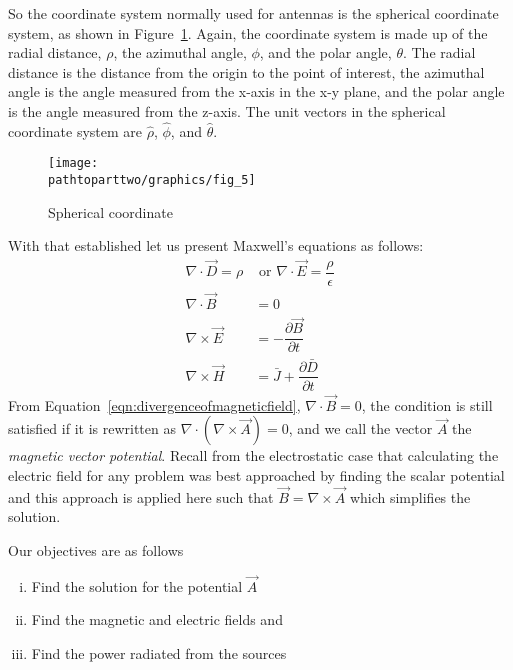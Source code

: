 So the coordinate system normally used for antennas is the spherical coordinate system, as shown in Figure~\ref{fig:sphericalcoordinate}. Again, the coordinate system is made up of the radial distance, $\rho$, the azimuthal angle, $\phi$, and the polar angle, $\theta$. The radial distance is the distance from the origin to the point of interest, the azimuthal angle is the angle measured from the x-axis in the x-y plane, and the polar angle is the angle measured from the z-axis. The unit vectors in the spherical coordinate system are $\hat{\rho}$, $\hat{\phi}$, and $\hat{\theta}$.
\begin{figure}[h]
\centering
\texttt{[image: \\pathtoparttwo/graphics/fig\_5]}
\caption{Spherical coordinate}
\label{fig:sphericalcoordinate}
\end{figure}

With that established let us present Maxwell's equations as follows:
\begin{align}
\nabla\cdot\vec{D} =\rho&\text{ or }\nabla \cdot\vec{E} =\dfrac{\rho}{\epsilon}\label{eqn:gausslaw}\\
\nabla\cdot\vec{B}&=0\label{eqn:divergenceofmagneticfield}\\
\nabla\times\vec{E}&=- \dfrac{\partial\vec{B}}{\partial t}\label{eqn:faradayslaw}\\
\nabla\times\vec{H}&=\bar{J}+\dfrac{\partial\bar{D}}{\partial t}\label{eqn:ampereslaw}
\end{align}
From Equation~\eqref{eqn:divergenceofmagneticfield}, $\nabla\cdot\vec{B}=0$, the condition is still satisfied if it is rewritten as $\nabla\cdot(\nabla\times\vec{A})=0$, and we call the vector $\vec{A}$ the \emph{magnetic vector potential}. Recall from the electrostatic case that calculating the electric field for any problem was best approached by finding the scalar potential and this approach is applied here such that $\vec{B}=\nabla\times\vec{A}$ which simplifies the solution.

Our objectives are as follows
\begin{enumerate}[(i)]
\item Find the solution for the potential $\vec{A}$
\item Find the magnetic and electric fields and
\item Find the power radiated from the sources
\end{enumerate}

